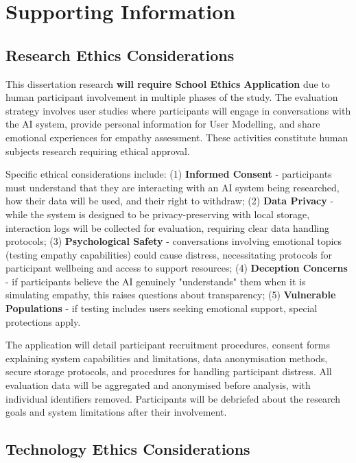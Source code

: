 \documentclass[a4paper,oneside,12pt]{book}
\numberwithin{equation}{chapter} %
\begin{document}
\chapter{Supporting Information}
\section{Research Ethics Considerations}

This dissertation research \textbf{will require School Ethics Application} due to human participant involvement in multiple phases of the study. The evaluation strategy involves user studies where participants will engage in conversations with the AI system, provide personal information for User Modelling, and share emotional experiences for empathy assessment. These activities constitute human subjects research requiring ethical approval.

Specific ethical considerations include: (1) \textbf{Informed Consent} - participants must understand that they are interacting with an AI system being researched, how their data will be used, and their right to withdraw; (2) \textbf{Data Privacy} - while the system is designed to be privacy-preserving with local storage, interaction logs will be collected for evaluation, requiring clear data handling protocols; (3) \textbf{Psychological Safety} - conversations involving emotional topics (testing empathy capabilities) could cause distress, necessitating protocols for participant wellbeing and access to support resources; (4) \textbf{Deception Concerns} - if participants believe the AI genuinely "understands" them when it is simulating empathy, this raises questions about transparency; (5) \textbf{Vulnerable Populations} - if testing includes users seeking emotional support, special protections apply.

The application will detail participant recruitment procedures, consent forms explaining system capabilities and limitations, data anonymisation methods, secure storage protocols, and procedures for handling participant distress. All evaluation data will be aggregated and anonymised before analysis, with individual identifiers removed. Participants will be debriefed about the research goals and system limitations after their involvement.

\section{Technology Ethics Considerations}
\end{document}

